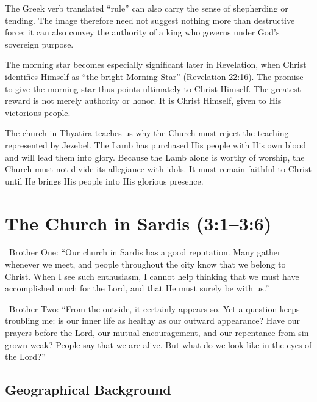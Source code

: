 The Greek verb translated ``rule'' can also carry the sense of shepherding or tending. The image therefore need not suggest nothing more than destructive force; it can also convey the authority of a king who governs under God's sovereign purpose.

The morning star becomes especially significant later in Revelation, when Christ identifies Himself as ``the bright Morning Star'' (Revelation 22:16). The promise to give the morning star thus points ultimately to Christ Himself. The greatest reward is not merely authority or honor. It is Christ Himself, given to His victorious people.

The church in Thyatira teaches us why the Church must reject the teaching represented by Jezebel. The Lamb has purchased His people with His own blood and will lead them into glory. Because the Lamb alone is worthy of worship, the Church must not divide its allegiance with idols. It must remain faithful to Christ until He brings His people into His glorious presence.

\section{The Church in Sardis (3:1--3:6)}

\begin{DialogueBox}
\noindent\faUser\ Brother One: ``Our church in Sardis has a good reputation. Many gather whenever we meet, and people throughout the city know that we belong to Christ. When I see such enthusiasm, I cannot help thinking that we must have accomplished much for the Lord, and that He must surely be with us.''

\vspace{0.1cm}

\noindent\faUser\ Brother Two: ``From the outside, it certainly appears so. Yet a question keeps troubling me: is our inner life as healthy as our outward appearance? Have our prayers before the Lord, our mutual encouragement, and our repentance from sin grown weak? People say that we are alive. But what do we look like in the eyes of the Lord?''
\end{DialogueBox}

\subsection{Geographical Background}

